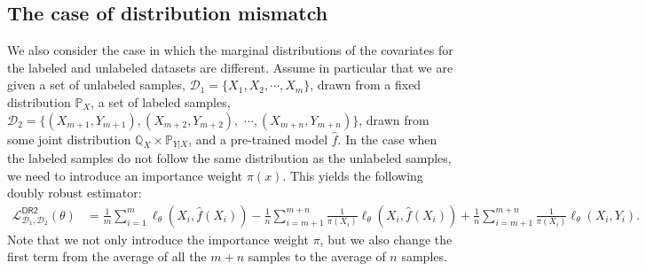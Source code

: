 \subsection{The case of distribution mismatch}\label{sec:mismatch}


We also consider the case in which the marginal distributions of the covariates for the labeled and unlabeled datasets are different.
Assume in particular that we are given a set of unlabeled samples, $\mathcal{D}_1 = \{X_1,X_2,\cdots, X_m\}$, drawn from a fixed distribution $\mathbb{P}_X$, a set of labeled samples, $\mathcal{D}_2 =\{(X_{m+1}, Y_{m+1}), (X_{m+2}, Y_{m+2}),$ $ \cdots, (X_{m+n}, Y_{m+n})\}$, drawn from some joint distribution $\mathbb{Q}_X\times \mathbb{P}_{Y|X}$, and a pre-trained model  $\hat f$. 
In the case when the labeled samples do not follow the same distribution as the unlabeled samples, we need to introduce an importance weight $\pi(x)$. This yields the following doubly robust estimator:
\begin{align*}
\mathcal{L}^{\mathsf{DR2}}_{\mathcal{D}_1,\mathcal{D}_2}(\theta) 
& = \frac{1}{m}  \sum_{i=1}^{m} \ell_\theta(X_i, \hat f(X_i)) -  \frac{1}{n} \sum_{i=m+1}^{m+n} \frac{1}{\pi(X_i)}\ell_\theta(X_i, \hat f(X_i))  + \frac{1}{n} \sum_{i=m+1}^{m+n} \frac{1}{\pi(X_i)}\ell_\theta(X_i, Y_i). 
\end{align*}
Note that we not only introduce the importance weight $\pi$, but we also change the first term from the average of all the $m+n$ samples to the average of $n$ samples. 

